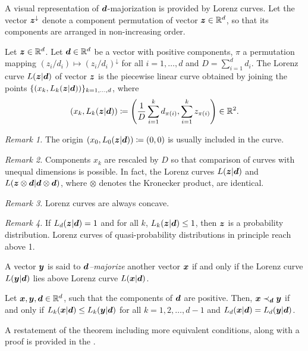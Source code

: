 \documentclass[pra,
aps,
twocolumn,
superscriptaddress,
groupedaddress,
nofootinbib,
reprint
]{revtex4-1}
\begin{document}
A visual representation of $\bm{d}$-majorization is provided by Lorenz curves.
Let the vector $\bm{z}^\downarrow$ denote a component permutation of vector $\bm{z} \in \mathbb{R}^d$, so that its components are arranged in non-increasing order.
\begin{definition}
    Let $\bm{z} \in \mathbb{R}^d$.
    Let $\bm{d} \in \mathbb{R}^d$ be a vector with positive components, $\pi$ a permutation mapping $(z_i/d_i) \mapsto (z_i/d_i)^\downarrow$ for all $i=1,\dots,d$ and $D = \sum_{i=1}^d d_i$.
    The Lorenz curve $L(\bm{z}|\bm{d})$ of vector $\bm{z}$ is the piecewise linear curve obtained by joining the points $\{ (x_k, L_k(\bm{z}|\bm{d})) \}_{k=1,\dots,d}$, where
    \begin{equation}\label{eq:lorenz}
        (x_k, L_k(\bm{z}|\bm{d})) \coloneqq \left( \frac{1}{D}\sum_{i=1}^k d_{\pi(i)}, \sum_{i=1}^k z_{\pi(i)} \right) \in \mathbb{R}^2.
    \end{equation}
\end{definition}
\emph{Remark 1.} The origin $(x_0, L_0(\bm{z}|\bm{d})) \coloneqq (0,0)$ is usually included in the curve.

\emph{Remark 2.} Components $x_k$ are rescaled by $D$ so that comparison of curves with unequal dimensions is possible.
In fact, the Lorenz curves $L(\bm{z}|\bm{d})$ and $L(\bm{z} \otimes \bm{d}|\bm{d} \otimes \bm{d})$, where $\otimes$ denotes the Kronecker product, are identical.

\emph{Remark 3.} Lorenz curves are always concave.

\emph{Remark 4.} If $L_d(\bm{z}|\bm{d}) = 1$ and for all $k$, $L_k(\bm{z}|\bm{d}) \leq 1$, then $\bm{z}$ is a probability distribution.
Lorenz curves of quasi-probability distributions in principle reach above 1.

A vector $\bm{y}$ is said to \emph{$\bm{d}$--majorize} another vector $\bm{x}$  if and only if the Lorenz curve $L(\bm{y}|\bm{d})$ lies above Lorenz curve $L(\bm{x}|\bm{d})$.
\begin{theorem}\label{thm:dmajor}
    Let $\bm{x}, \bm{y}, \bm{d} \in \mathbb{R}^d$, such that the components of $\bm{d}$ are positive. 
    Then, $\bm{x} \prec_{\bm{d}} \bm{y}$ if and only if $L_k(\bm{x}|\bm{d}) \leq L_k(\bm{y}|\bm{d})$ for all $k=1,2,\dots, d-1$ and $L_d(\bm{x}|\bm{d}) = L_d(\bm{y}|\bm{d})$.
\end{theorem}
A restatement of the theorem including more equivalent conditions, along with a proof is provided in the .
\end{document}
